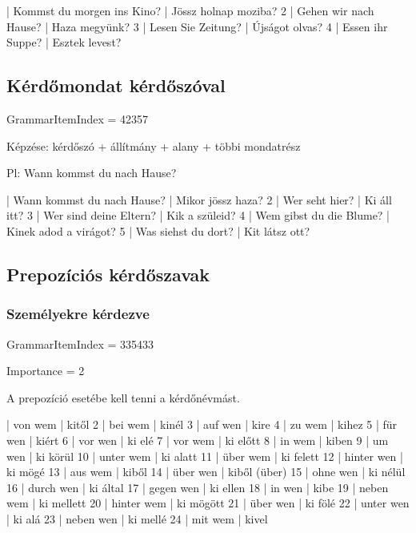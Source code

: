\documentclass{article}
\newenvironment{desc}{\verbatim}{\endverbatim}
\newenvironment{exmp}{\verbatim}{\endverbatim}
\begin{document}
\begin{exmp}
1 | Kommst du morgen ins Kino? | Jössz holnap moziba?
2 | Gehen wir nach Hause? | Haza megyünk?
3 | Lesen Sie Zeitung? | Újságot olvas?
4 | Essen ihr Suppe? | Esztek levest?
\end{exmp}

\subsection{Kérdőmondat kérdőszóval}

GrammarItemIndex = 42357

\begin{desc}
Képzése: kérdőszó + állítmány + alany + többi mondatrész

Pl: Wann kommst du nach Hause?
\end{desc}

\begin{exmp}
1 | Wann kommst du nach Hause? | Mikor jössz haza?
2 | Wer seht hier? | Ki áll itt?
3 | Wer sind deine Eltern? | Kik a szüleid?
4 | Wem gibst du die Blume? | Kinek adod a virágot?
5 | Was siehst du dort? | Kit látsz ott?
\end{exmp}

\subsection{Prepozíciós kérdőszavak}

\subsubsection{Személyekre kérdezve}

GrammarItemIndex = 335433

Importance = 2

\begin{desc}
A prepozíció esetébe kell tenni a kérdőnévmást.
\end{desc}

\begin{exmp}
1 | von wem | kitől
2 | bei wem | kinél
3 | auf wen | kire
4 | zu wem | kihez
5 | für wen | kiért
6 | vor wen | ki elé
7 | vor wem | ki előtt
8 | in wem | kiben
9 | um wen | ki körül
10 | unter wem | ki alatt
11 | über wem | ki felett
12 | hinter wen | ki mögé
13 | aus wem | kiből
14 | über wen | kiből (über)
15 | ohne wen | ki nélül
16 | durch wen | ki által
17 | gegen wen | ki ellen
18 | in wen | kibe
19 | neben wem | ki mellett
20 | hinter wem | ki mögött
21 | über wen | ki fölé
22 | unter wen | ki alá
23 | neben wen | ki mellé
24 | mit wem | kivel
\end{exmp}
\end{document}
